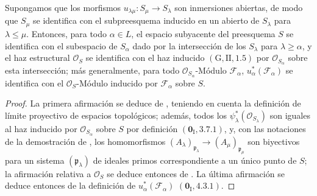 \begin{proposition}[8.2.13]
\label{IV.8.2.13-fr}
Supongamos que los morfismos $u_{\lambda\mu}:S_\mu\to S_\lambda$ son inmersiones abiertas, de modo que $S_\mu$ se identifica con el subpreesquema inducido en un abierto de $S_\lambda$ para $\lambda\leq\mu$.
Entonces, para todo $\alpha\in L$, el espacio subyacente del preesquema $S$ se identifica con el subespacio de $S_\alpha$ dado por la intersección de los $S_\lambda$ para $\lambda\geq\alpha$, y el haz estructural $\mathcal O_S$ se identifica con el haz inducido $(\mathrm G,\mathrm{II},1.5)$ por $\mathcal O_{S_\alpha}$ sobre esta intersección; más generalmente, para todo $\mathcal O_{S_\alpha}$-Módulo $\mathscr F_\alpha$, $u_\alpha^*(\mathscr F_\alpha)$ se identifica con el $\mathcal O_S$-Módulo inducido por $\mathscr F_\alpha$ sobre $S$.
\end{proposition}

\begin{proof}

La primera afirmación se deduce de , teniendo en cuenta la definición de límite proyectivo de espacios topológicos; además, todos los $\psi_\lambda^*(\mathcal O_{S_\lambda})$ son iguales al haz inducido por $\mathcal O_{S_\alpha}$ sobre $S$ por definición $(\mathbf{0}_{\mathrm I},3.7.1)$, y, con las notaciones de la demostración de , los homomorfismos $(A_\lambda)_{\mathfrak p_\lambda}\to
(A_\mu)_{\mathfrak p_\mu}$ son biyectivos para un sistema $(\mathfrak p_\lambda)$ de ideales primos correspondiente a un único punto de $S$; la afirmación relativa a $\mathcal O_S$ se deduce entonces de .
La última afirmación se deduce entonces de la definición de $u_\alpha^*(\mathscr F_\alpha)$ $(\mathbf{0}_{\mathrm I},4.3.1)$.
\end{proof}

